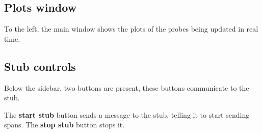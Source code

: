     \subsection{Plots window}
        To the left, the main window shows the plots of the probes being updated in real time. 

    \subsection{Stub controls}
        Below the sidebar, two buttons are present, these buttons communicate to the stub. 
         
        The \textbf{start stub} button sends a message to the stub, telling it to start sending spans. The \textbf{stop stub} button stops it.
